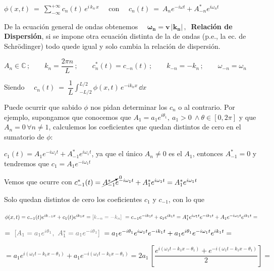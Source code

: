 \begin{adjustwidth}{30pt}{30pt}
\begin{destacado}
$\phi(x,t) \ = \ \displaystyle \sum_{-\infty}^{+\infty} c_n(t) \, e^{i\,k_n \, x} \quad $ con $\quad c_n(t) \ = \ A_ne^{-i\omega t} + A^*_{-n} e^{i\omega_n t} $

De la ecuación general de ondas  obtenemos $\quad \boldsymbol{\omega_n = v\, |k_n|}\, ,  \ $ \textbf{Relación de Dispersión}, si se impone otra ecuación distinta de la de ondas (p.e., la ec. de Schrödinger) todo quede igual y solo cambia la relación de dispersión.

$A_n\in \mathbb C \, ; \qquad k_n=\dfrac{2\pi n}{L} \, ; \qquad c^*_n(t)=c_{-n}(t)\, ; \qquad k_{-n}=-k_n \, ; \qquad \omega_{-n}=\omega_n$

Siendo $\quad\displaystyle c_n(t) \ = \ \dfrac 1 L \int_{-L/2}^{L/2} \phi(x,t)\, e^{-ik_nx} \, \dd x$
\end{destacado}
\end{adjustwidth}
\vspace{5mm} 

Puede ocurrir que sabido $\phi$ nos pidan determinar los $c_n$ o al contrario. Por ejemplo, supongamos que conocemos que $A_1=a_1e^{i\theta_1},\ a_1>0 \ \wedge \theta \in [0,2\pi]$ y que $A_n=0\, \forall n\neq 1$, calculemos los coeficientes que quedan distintos de cero en el sumatorio de $\phi$:

$c_1(t)=A_1e^{-i\omega_1t}+A_{-1}^*e^{i\omega_1t}$, ya que el único $A_n\neq 0$ es el $A_1$, entonces $A_{-1}^*=0$ y tendremos que $c_1=A_1e^{-i\omega_1 t}$

Vemos que ocurre con $c_{-1}^*(t)=\cancelto{0}{A_{-1}^*}e^{-i\omega_1 t}+A_1^*e^{i\omega_1 t}=A_1^*e^{i\omega_1 t}$

Solo quedan distintos de cero los coeficientes $c_1$ y $c_{-1}$, con lo que

$\phi(x,t)=c_{-1}(t)e^{ik_{-1} x} + c_1(t)e^{ik_1 x }= \textcolor{gris}{[k_{-n}=-k_n]} \ = c_{-1}e^{-ik_1 t}+c_1e^{ik_1 t} =
A_1^*e^{i\omega_1 t}e^{-ik_1 t}+ A_1e^{-i\omega_1 t} e^{ik_1 t}=$

$=
 \ \textcolor{gris}{[A_1=a_1e^{i\theta_1},\ A_1^*=a_1e^{-i\theta_1}]} \ =
 a_1 e^{-i\theta_1} e^{i\omega_1 t}e^{-ik_1 t}+ a_1 e^{i\theta_1}e^{-i\omega_1 t} e^{ik_1 t} = $
 
 $= a_1e^{i(\omega_1 t -k_1 x -\theta_1)}+a_1e^{-i(\omega_1 t -k_1 x -\theta_1)}=
2a_1 \, \left[ \dfrac{
e^{i(\omega_1 t -k_1 x -\theta_1)}+e^{-i(\omega_1 t -k_1 x -\theta_1)}
}{2}\right]=$

